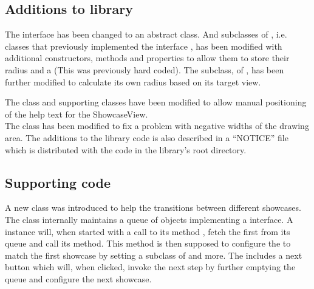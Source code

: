 \subsection{Additions to library}

The interface  has been changed to an abstract class. And subclasses of , i.e. classes that previously implemented the interface , has been modified with additional constructors, methods and properties to allow them to store their radius and a  (This was previously hard coded). The  subclass, of , has been further modified to calculate its own radius based on its target view.  

The  class and supporting classes have been modified to allow manual positioning of the help text for the ShowcaseView.\\ 
The  class has been modified to fix a problem with negative widths of the drawing area.
The additions to the library code is also described in a ``NOTICE'' file which is distributed with the code in the library's root directory. 

\subsection{Supporting code}

A new class  was introduced to help the transitions between different showcases. The class internally maintains a queue of objects implementing a  interface. A  instance will, when started with a call to its method , fetch the first  from its queue and call its  method. This  method is then supposed to configure the  to match the first showcase by setting a subclass of  and more. The  includes a next button which will, when clicked, invoke the next step by further emptying the queue and configure the next showcase.




